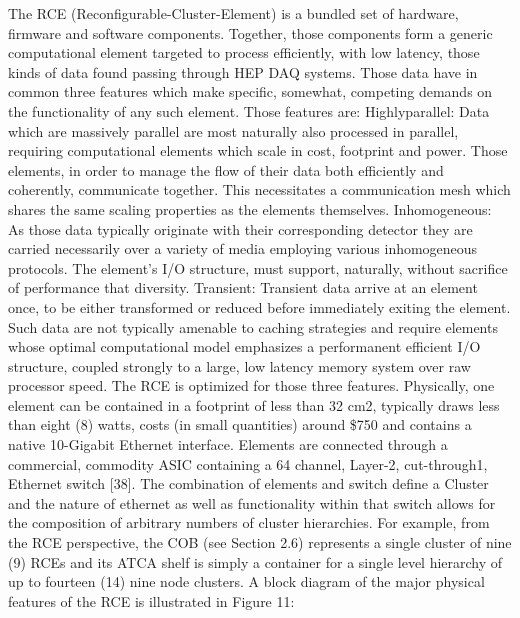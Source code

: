 The RCE (Reconfigurable-Cluster-Element) is a bundled set of hardware, firmware and software components. Together, those components form a generic computational element targeted to process efficiently, with low latency, those kinds of data found passing through HEP DAQ systems. Those data have in common three features which make specific, somewhat, competing demands on the functionality of any such element. Those features are:
Highlyparallel: Data which are massively parallel are most naturally also processed in parallel, requiring computational elements which scale in cost, footprint and power. Those elements, in order to manage the flow of their data both efficiently and coherently, communicate together. This necessitates a communication mesh which shares the same scaling properties as the elements themselves.
Inhomogeneous: As those data typically originate with their corresponding detector they are carried necessarily over a variety of media employing various inhomogeneous protocols. The element's I/O structure, must support, naturally, without sacrifice of performance that diversity.
Transient:
Transient data arrive at an element once, to be either transformed or reduced before immediately exiting the element. Such data are not typically amenable to caching strategies and require elements whose optimal computational model emphasizes a performanent efficient I/O structure, coupled strongly to a large, low latency memory system over raw processor speed.
The RCE is optimized for those three features. Physically, one element can be contained in a footprint of less than 32 cm2, typically draws less than eight (8) watts, costs (in small quantities) around \$750 and contains a native 10-Gigabit Ethernet interface. Elements are connected through a commercial, commodity ASIC containing a 64 channel, Layer-2, cut-through1, Ethernet switch [38]. The combination of elements and switch define a Cluster and the nature of ethernet as well as functionality within that switch allows for the composition of arbitrary numbers of cluster hierarchies. For example, from the RCE perspective, the COB (see Section 2.6) represents a single cluster of nine (9) RCEs and its ATCA shelf is simply a container for a single level hierarchy of up to fourteen (14) nine node clusters. A block diagram of the major physical features of the RCE is illustrated in Figure 11:

